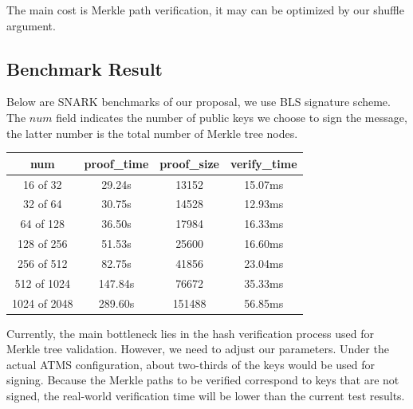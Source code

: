 \documentclass{article}
\begin{document}
The main cost is Merkle path verification, it may can be optimized by our shuffle argument.


\subsection{Benchmark Result}

Below are SNARK benchmarks of our proposal, we use BLS signature scheme. The $num $ field indicates the number of public keys we choose to sign the message, the latter number is the total number of Merkle tree nodes.

\begin{table}[htbp]
    \centering
    \renewcommand{\arraystretch}{1.1} %
    \setlength{\tabcolsep}{10pt}      %
    \begin{tabular}{c|c|c|c} \hline
        \textbf{num} & \textbf{proof\_time} & \textbf{proof\_size} & \textbf{verify\_time} \\ \hline
        16 of 32    & 29.24s  & 13152  & 15.07ms  \\
        32 of 64    & 30.75s  & 14528  & 12.93ms  \\
        64 of 128   & 36.50s  & 17984  & 16.33ms  \\
        128 of 256  & 51.53s  & 25600  & 16.60ms  \\
        256 of 512  & 82.75s  & 41856  & 23.04ms  \\
        512 of 1024 & 147.84s & 76672  & 35.33ms  \\
        1024 of 2048 & 289.60s & 151488 & 56.85ms  \\ \hline
    \end{tabular}
    \label{tab:example_benchmark_selected}
\end{table}

Currently, the main bottleneck lies in the hash verification process used for Merkle tree validation. However, we need to adjust our parameters. Under the actual ATMS configuration, about two-thirds of the keys would be used for signing. Because the Merkle paths to be verified correspond to keys that are not signed, the real-world verification time will be lower than the current test results. 
\newpage
\end{document}

